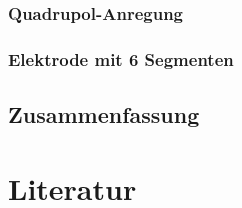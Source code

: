 \documentclass[numbers=noenddot,a4paper]{scrartcl}
\begin{document}
            \subsubsection{Quadrupol-Anregung}

            \subsubsection{Elektrode mit 6 Segmenten}

         \subsection{Zusammenfassung}

	\newpage

	\section{Literatur}\label{sec:lit}

		
		

%

%		
%
\end{document}
